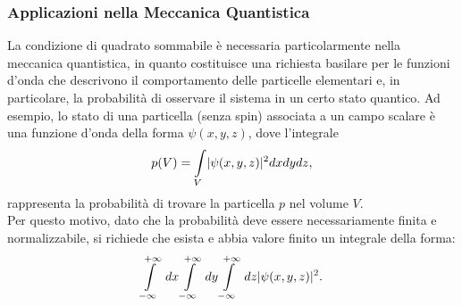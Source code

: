 \documentclass[12pt,oneside,openany]{memoir}
\numberwithin{equation}{subsection}
\DeclarePairedDelimiter{\abs}{\lvert}{\rvert}
\begin{document}

\subsubsection{Applicazioni nella Meccanica Quantistica}
La condizione di quadrato sommabile \`e necessaria particolarmente nella
meccanica quantistica, in quanto costituisce una richiesta basilare per le
funzioni d'onda che descrivono il comportamento delle particelle elementari e,
in particolare, la probabilit\`a di osservare il sistema in un certo stato
quantico. Ad esempio, lo stato di una particella (senza spin) associata a un
campo scalare \`e una funzione d'onda della forma $\psi(x, y, z)$, dove
l'integrale
\begin{equation}
	p(V) = \int\displaylimits_{V} \abs{\psi(x, y, z)}^2 dx dy dz,
\end{equation}
rappresenta la probabilit\`a di trovare la particella $p$ nel volume $V$.\\
Per questo motivo, dato che la probabilit\`a deve essere necessariamente finita
e normalizzabile, si richiede che esista e abbia valore finito un integrale
della forma:
\begin{equation}
	\int\displaylimits_{-\infty}^{+\infty} \ dx
	\int\displaylimits_{-\infty}^{+\infty} \ dy
	\int\displaylimits_{-\infty}^{+\infty} \ dz \abs{\psi(x, y, z)}^2.
\end{equation}


\newpage
\end{document}
